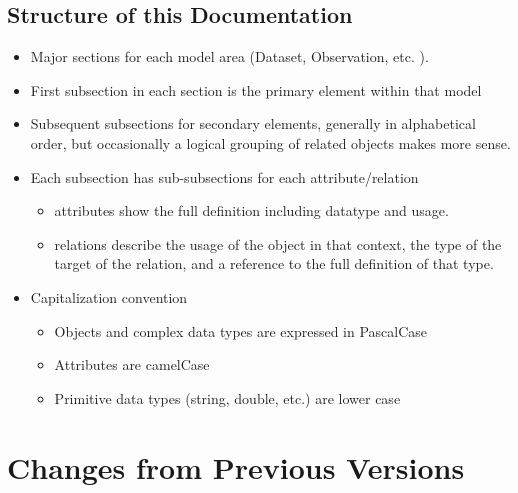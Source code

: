 \documentclass[11pt,a4paper]{ivoa}
\begin{document}
\subsection{Structure of this Documentation}
\begin{itemize}
  \item  Major sections for each model area (Dataset, Observation, etc. ).
  \item  First subsection in each section is the primary element within that model
  \item  Subsequent subsections for secondary elements, generally in alphabetical order,
but occasionally a logical grouping of related objects makes more sense.
  \item  Each subsection has sub-subsections for each attribute/relation
  \begin{itemize}
    \item  attributes show the full definition including datatype and usage.
    \item  relations describe the usage of the object in that context,
      the type of the target of the relation, and a reference to the full
      definition of that type.
  \end{itemize}
  \item  Capitalization convention
  \begin{itemize}
    \item  Objects and complex data types are expressed in PascalCase
    \item  Attributes are camelCase
    \item  Primitive data types (string, double, etc.) are lower case
  \end{itemize}
\end{itemize}


\pagebreak



\pagebreak
\section{Changes from Previous Versions}


\appendix




\pagebreak

\end{document}
